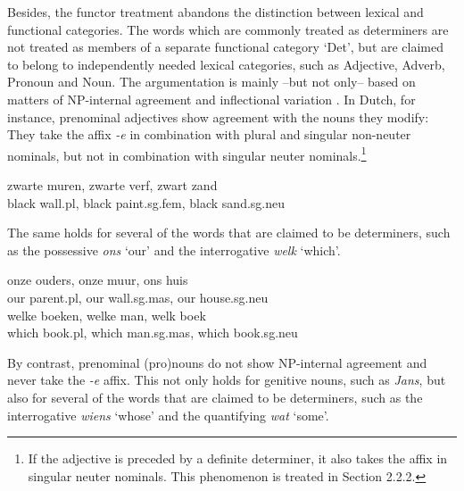 \documentclass[output=paper]{langsci/langscibook}
\begin{document}
Besides, the functor treatment abandons the distinction between lexical and 
functional categories. The words which are commonly treated as determiners
are not treated as members of a separate functional category `Det', but are 
claimed to belong to independently needed lexical categories, such as Adjective, 
Adverb, Pronoun and Noun. The argumentation is mainly --but not only-- based on 
matters of NP-internal agreement and inflectional variation \citep{VanEynde06}. 
In Dutch, for instance, prenominal adjectives show agreement with 
the nouns they modify: They take the affix {\it -e\/} in combination with plural 
and singular non-neuter nominals, but not in combination with singular 
neuter nominals.\footnote{If the adjective is preceded by a definite determiner, 
it also takes the affix in singular neuter nominals. This phenomenon is treated 
in Section 2.2.2.} 

\begin{exe} 
\ex\label{wit} 
\gll  zwarte muren,        zwarte verf,              zwart zand \\
      black wall.{\sc pl}, black paint.{\sc sg.fem}, black sand.{\sc sg.neu} \\
\end{exe} 

\noindent
The same holds for several of the words that are claimed to be determiners, 
such as the possessive {\it ons\/} `our' and the interrogative {\it welk\/} `which'. 

\begin{exe} 
\ex\label{ons}
\gll onze ouders,         onze muur,             ons huis     \\
     our parent.{\sc pl}, our wall.{\sc sg.mas}, our house.{\sc sg.neu} \\
\ex\label{welk} 
\gll welke boeken,        welke man,              welk boek   \\
     which book.{\sc pl}, which man.{\sc sg.mas}, which book.{\sc sg.neu} \\
\end{exe} 

\noindent
By contrast, prenominal (pro)nouns do not show NP-internal agreement and  
never take the {\it -e\/} affix. This not only holds for genitive nouns, 
such as {\it Jans}, but also for several of the words that are claimed 
to be determiners, such as the interrogative {\it wiens\/} `whose' 
and the quantifying {\it wat\/} `some'. 
\end{document}
